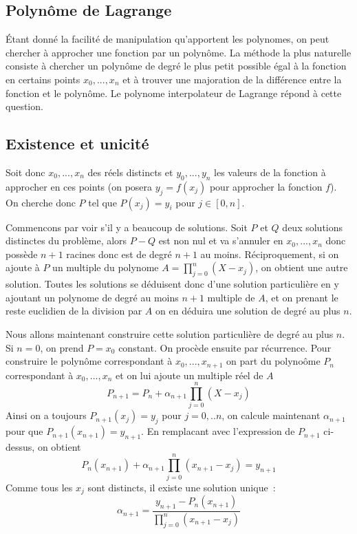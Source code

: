 \documentclass[a4paper,11pt]{book}
\begin{document}
\begin{giacjshere}
\section{Polyn\^ome de Lagrange} 
\'Etant donn\'e la facilit\'e de manipulation qu'apportent les
polynomes, on peut chercher \`a approcher une fonction par un
polyn\^ome. La m\'ethode la plus naturelle consiste \`a chercher
un polyn\^ome de degr\'e le plus petit possible
\'egal \`a la fonction en certains points $x_0,...,x_n$
et \`a trouver une majoration de la diff\'erence entre la fonction
et le polyn\^ome.
Le polynome interpolateur de Lagrange r\'epond \`a cette question.

\subsection{Existence et unicit\'e}
Soit donc $x_0,...,x_n$ des r\'eels distincts et $y_0,...,y_n$
les valeurs de la fonction \`a approcher en ces points (on posera
$y_j=f(x_j)$ pour approcher la fonction $f$). On cherche
donc $P$ tel que $P(x_j)=y_i$ pour $j \in [0,n]$.

Commencons par voir s'il y a beaucoup de solutions. Soit $P$ et $Q$
deux solutions distinctes du probl\`eme, alors $P-Q$ est non nul
et va s'annuler en $x_0, ...,x_n$ donc poss\`ede $n+1$ racines donc
est de degr\'e $n+1$ au moins. R\'eciproquement, si on ajoute
\`a $P$ un multiple du polynome $A=\prod_{j=0}^n (X-x_j)$, on obtient
une autre solution. Toutes les solutions se d\'eduisent donc
d'une solution particuli\`ere en y ajoutant un polynome de degr\'e
au moins $n+1$ multiple de $A$, et on prenant le
reste euclidien de la division par $A$ on en d\'eduira une solution de
degr\'e au plus $n$.

Nous allons maintenant construire
cette solution particuli\`ere de degr\'e au plus $n$.
Si $n=0$, on prend $P=x_0$ constant. On proc\`ede ensuite par
r\'ecurrence. Pour construire le polyn\^ome correspondant
\`a $x_0,...,x_{n+1}$ on part du polyno\^ome $P_n$ correspondant \`a
$x_0,...,x_{n}$ et on lui ajoute un multiple r\'eel de $A$
\[ P_{n+1}=P_n+ \alpha_{n+1} \prod_{j=0}^n (X-x_j) \]
Ainsi on a toujours $P_{n+1}(x_j)=y_j$ pour $j=0,..n$, on calcule
maintenant $ \alpha_{n+1}$ pour que $P_{n+1}(x_{n+1})=y_{n+1}$.
En remplacant avec l'expression de $P_{n+1}$ ci-dessus, on obtient
\[ P_n(x_{n+1})+  \alpha_{n+1} \prod_{j=0}^n (x_{n+1}-x_j) = y_{n+1} \]
Comme tous les $x_j$ sont distincts, il existe une solution unique~:
\[  \alpha_{n+1}=\frac{y_{n+1}-P_n(x_{n+1})}{\prod_{j=0}^n (x_{n+1}-x_j)}\]


\end{giacjshere}
\end{document}
